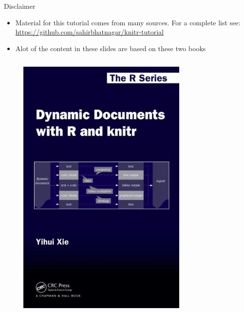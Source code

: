 \documentclass[10pt]{beamer}\usepackage[]{graphicx}\usepackage[]{color}
\begin{document}
\begin{frame}{Disclaimer}

\begin{itemize}
\item Material for this tutorial comes from many sources. For a complete list see:  \href{https://github.com/sahirbhatnagar/knitr-tutorial}{https://github.com/sahirbhatnagar/knitr-tutorial}
\item Alot of the content in these slides are based on these two books
\end{itemize}

\begin{columns}[c] %
\begin{figure}
\includegraphics[width=0.6\columnwidth]{yihui.png}
\end{figure}


\end{columns}
\end{frame}
\end{document}
